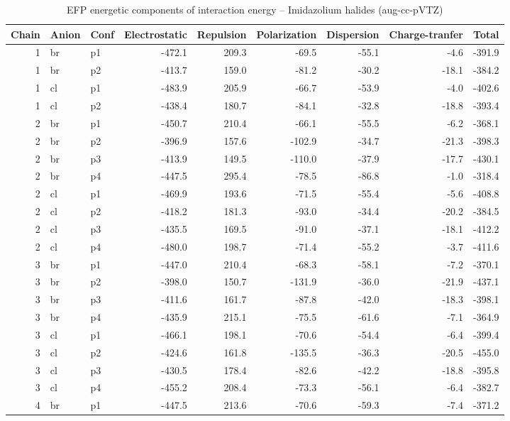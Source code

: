 \documentclass[a4paper]{article}
\begin{document}
\begin{table}[ht]
\centering
\footnotesize
\caption{EFP energetic components of interaction energy -- Imidazolium halides (aug-cc-pVTZ)}
\begin{tabular}{rllrrrrrr}
  \hline
Chain & Anion & Conf & Electrostatic & Repulsion & Polarization & Dispersion & Charge-tranfer & Total \\ 
  \hline
 1 & br & p1 & -472.1 & 209.3 & -69.5 & -55.1 & -4.6 & -391.9 \\ 
   1 & br & p2 & -413.7 & 159.0 & -81.2 & -30.2 & -18.1 & -384.2 \\ 
   1 & cl & p1 & -483.9 & 205.9 & -66.7 & -53.9 & -4.0 & -402.6 \\ 
   1 & cl & p2 & -438.4 & 180.7 & -84.1 & -32.8 & -18.8 & -393.4 \\ 
   2 & br & p1 & -450.7 & 210.4 & -66.1 & -55.5 & -6.2 & -368.1 \\ 
   2 & br & p2 & -396.9 & 157.6 & -102.9 & -34.7 & -21.3 & -398.3 \\ 
   2 & br & p3 & -413.9 & 149.5 & -110.0 & -37.9 & -17.7 & -430.1 \\ 
   2 & br & p4 & -447.5 & 295.4 & -78.5 & -86.8 & -1.0 & -318.4 \\ 
   2 & cl & p1 & -469.9 & 193.6 & -71.5 & -55.4 & -5.6 & -408.8 \\ 
   2 & cl & p2 & -418.2 & 181.3 & -93.0 & -34.4 & -20.2 & -384.5 \\ 
   2 & cl & p3 & -435.5 & 169.5 & -91.0 & -37.1 & -18.1 & -412.2 \\ 
   2 & cl & p4 & -480.0 & 198.7 & -71.4 & -55.2 & -3.7 & -411.6 \\ 
   3 & br & p1 & -447.0 & 210.4 & -68.3 & -58.1 & -7.2 & -370.1 \\ 
   3 & br & p2 & -398.0 & 150.7 & -131.9 & -36.0 & -21.9 & -437.1 \\ 
   3 & br & p3 & -411.6 & 161.7 & -87.8 & -42.0 & -18.3 & -398.1 \\ 
   3 & br & p4 & -435.9 & 215.1 & -75.5 & -61.6 & -7.1 & -364.9 \\ 
   3 & cl & p1 & -466.1 & 198.1 & -70.6 & -54.4 & -6.4 & -399.4 \\ 
   3 & cl & p2 & -424.6 & 161.8 & -135.5 & -36.3 & -20.5 & -455.0 \\ 
   3 & cl & p3 & -430.5 & 178.4 & -82.6 & -42.2 & -18.8 & -395.8 \\ 
   3 & cl & p4 & -455.2 & 208.4 & -73.3 & -56.1 & -6.4 & -382.7 \\ 
   4 & br & p1 & -447.5 & 213.6 & -70.6 & -59.3 & -7.4 & -371.2 \\ 

\end{tabular}
\end{table}
\end{document}
